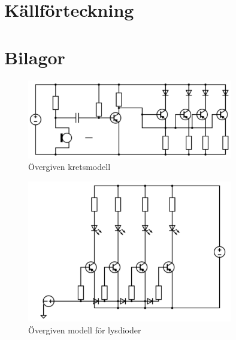 \documentclass[12pt]{report}
\begin{document}
\chapter*{Källförteckning}
\label{chap:source}
\printbibliography[heading=none]


\chapter*{Bilagor}
\label{chap:bilagor}
\setcounter{figure}{3}
\begin{figure}[ht]
  \centering
  \includegraphics[width=0.8\textwidth]{bilder/bilaga1.png}
  \caption{Övergiven kretsmodell}
  \label{fig:bil1}
\end{figure}

\begin{figure}[ht]
  \centering
  \includegraphics[width=0.8\textwidth]{bilder/bilaga2.png}
  \caption{Övergiven modell för lysdioder}
  \label{fig:bil2}
\end{figure}
\end{document}
